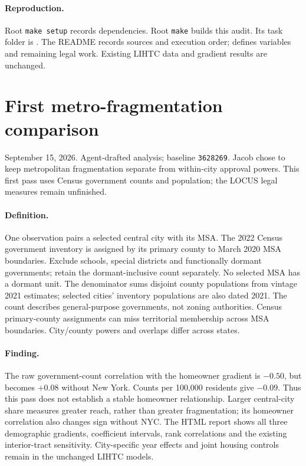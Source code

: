 \documentclass[11pt]{article}
\begin{document}
\paragraph{Reproduction.} Root \texttt{make setup} records dependencies.
Root \texttt{make} builds this audit. Its task folder is
. The README
records sources and execution order;  defines variables
and remaining legal work. Existing LIHTC data and gradient results are unchanged.
\clearpage
\section*{First metro-fragmentation comparison}
\noindent September 15, 2026. Agent-drafted analysis; baseline \texttt{3628269}.
Jacob chose to keep metropolitan fragmentation separate from within-city
approval powers. This first pass uses Census government counts and population;
the LOCUS legal measures remain unfinished.

\paragraph{Definition.} One observation pairs a selected central city with its
MSA. The 2022 Census government inventory is assigned by its primary county to
March 2020 MSA boundaries. Exclude schools, special districts and functionally
dormant governments; retain the dormant-inclusive count separately. No selected
MSA has a dormant unit. The denominator sums disjoint county populations from
vintage 2021 estimates; selected cities' inventory populations are also dated 2021.
The count describes general-purpose governments, not zoning authorities.
Census primary-county assignments can miss territorial membership across MSA
boundaries. City/county powers and overlaps differ across states.



\paragraph{Finding.} The raw government-count correlation with the homeowner
gradient is $-0.50$, but becomes $+0.08$ without New York. Counts per 100,000
residents give $-0.09$. Thus this pass does not establish a stable homeowner
relationship. Larger central-city share measures greater reach, rather than
greater fragmentation; its homeowner correlation also changes sign without NYC.
The HTML report shows all three demographic gradients, coefficient intervals,
rank correlations and the existing interior-tract sensitivity. City-specific
year effects and joint housing controls remain in the unchanged LIHTC models.
\end{document}
